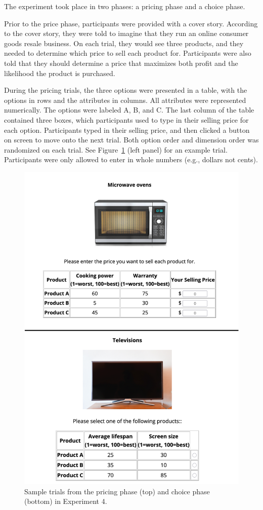 The experiment took place in two phases: a pricing phase and a choice phase.

Prior to the price phase, participants were provided with a cover story. According to the cover story, they were told to imagine that they run an online consumer goods resale business. On each trial, they would see three products, and they needed to determine which price to sell each product for. Participants were also told that they should determine a price that maximizes both profit and the likelihood the product is purchased. 

During the pricing trials, the three options were presented in a table, with the options in rows and the attributes in columns. All attributes were represented numerically. The options were labeled A, B, and C. The last column of the table contained three boxes, which participants used to type in their selling price for each option. Participants typed in their selling price, and then clicked a button on screen to move onto the next trial. Both option order and dimension order was randomized on each trial. See Figure~\ref{fig:ce_rating_choice_trial} (left panel) for an example trial. Participants were only allowed to enter in whole numbers (e.g., dollars not cents).

\begin{figure}
    \includegraphics{figures/ce_rating_choice_example_trial.jpg}
    \caption{Sample trials from the pricing phase (top) and choice phase (bottom) in Experiment 4.}
    \label{fig:ce_rating_choice_trial}
\end{figure}

